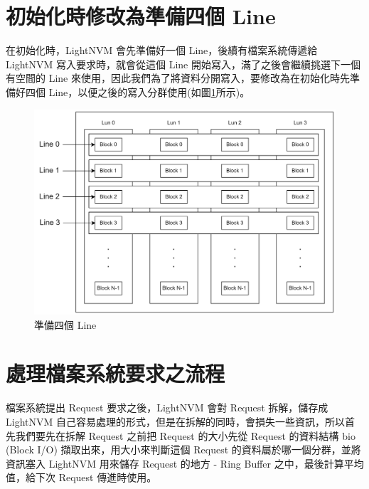 \section{初始化時修改為準備四個 Line}\label{s3.1}
\indent
在初始化時，LightNVM 會先準備好一個 Line，後續有檔案系統傳遞給 LightNVM 寫入要求時，就會從這個 Line 開始寫入，滿了之後會繼續挑選下一個有空間的 Line 來使用，因此我們為了將資料分開寫入，要修改為在初始化時先準備好四個 Line，以便之後的寫入分群使用(如圖\ref{f3.4}所示)。

\begin{figure}[H]
    \centering
    \includegraphics[width=1\textwidth]{picture/ch3/4Line.png}
    \caption{準備四個 Line}
    \label{f3.4}
\end{figure}

\section{處理檔案系統要求之流程}\label{s3.2}
\indent
檔案系統提出 Request 要求之後，LightNVM 會對 Request 拆解，儲存成 LightNVM 自己容易處理的形式，但是在拆解的同時，會損失一些資訊，所以首先我們要先在拆解 Request 之前把 Request 的大小先從 Request 的資料結構 bio (Block I/O) \cite{10.1145/2619092}擷取出來，用大小來判斷這個 Request 的資料屬於哪一個分群，並將資訊塞入 LightNVM 用來儲存 Request 的地方 - Ring Buffer 之中，最後計算平均值，給下次 Request 傳進時使用。\cite{LightNVM}
\newpage

